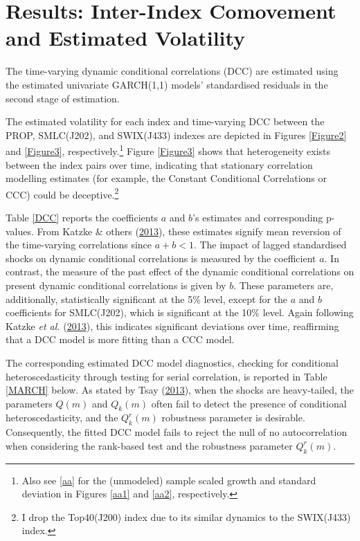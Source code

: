 \documentclass[11pt,preprint, authoryear]{elsarticle}
\numberwithin{equation}{section}
\numberwithin{figure}{section}
\numberwithin{table}{section}
\let\rmarkdownfootnote\footnote%
\def\footnote{\protect\rmarkdownfootnote}
\begin{document}
\hypertarget{results-inter-index-comovement-and-estimated-volatility}{%
\section{Results: Inter-Index Comovement and Estimated
Volatility}\label{results-inter-index-comovement-and-estimated-volatility}}

The time-varying dynamic conditional correlations (DCC) are estimated
using the estimated univariate GARCH(1,1) models' standardised residuals
in the second stage of estimation.

The estimated volatility for each index and time-varying DCC between the
PROP, SMLC(J202), and SWIX(J433) indexes are depicted in Figures
\ref{Figure2} and \ref{Figure3}, respectively.\footnote{Also see
  \ref{aa} for the (unmodeled) sample scaled growth and standard
  deviation in Figures \ref{aa1} and \ref{aa2}, respectively.} Figure
\ref{Figure3} shows that heterogeneity exists between the index pairs
over time, indicating that stationary correlation modelling estimates
(for example, the Constant Conditional Correlations or CCC) could be
deceptive.\footnote{I drop the Top40(J200) index due to its similar
  dynamics to the SWIX(J433) index.}

Table \ref{DCC} reports the coefficients \(a\) and \(b\)'s estimates and
corresponding p-values. From Katzke \& others
(\protect\hyperlink{ref-katzke2013}{2013}), these estimates signify mean
reversion of the time-varying correlations since \(a + b < 1\). The
impact of lagged standardised shocks on dynamic conditional correlations
is measured by the coefficient \(a\). In contrast, the measure of the
past effect of the dynamic conditional correlations on present dynamic
conditional correlations is given by \(b\). These parameters are,
additionally, statistically significant at the 5\(\%\) level, except for
the \(a\) and \(b\) coefficients for SMLC(J202), which is significant at
the 10\(\%\) level. Again following Katzke \emph{et al.}
(\protect\hyperlink{ref-katzke2013}{2013}), this indicates significant
deviations over time, reaffirming that a DCC model is more fitting than
a CCC model.

The corresponding estimated DCC model diagnostics, checking for
conditional heteroscedasticity through testing for serial correlation,
is reported in Table \ref{MARCH} below. As stated by Tsay
(\protect\hyperlink{ref-tsay2013}{2013}), when the shocks are
heavy-tailed, the parameters \(Q(m)\) and \(Q_k(m)\) often fail to
detect the presence of conditional heteroscedasticity, and the
\(Q_k^r (m)\) robustness parameter is desirable. Consequently, the
fitted DCC model fails to reject the null of no autocorrelation when
considering the rank-based test and the robustness parameter
\(Q_k^r (m)\).
\end{document}
